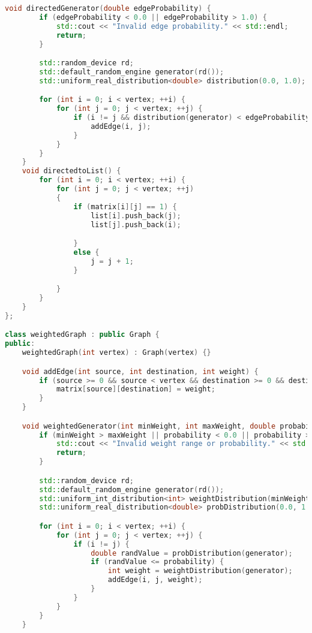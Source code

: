 \documentclass{article}
\begin{document}
\begin {small}
\begin{lstlisting}[language=C++]
    void directedGenerator(double edgeProbability) {
        if (edgeProbability < 0.0 || edgeProbability > 1.0) {
            std::cout << "Invalid edge probability." << std::endl;
            return;
        }

        std::random_device rd;
        std::default_random_engine generator(rd());
        std::uniform_real_distribution<double> distribution(0.0, 1.0);

        for (int i = 0; i < vertex; ++i) {
            for (int j = 0; j < vertex; ++j) {
                if (i != j && distribution(generator) < edgeProbability) {
                    addEdge(i, j);
                }
            }
        }
    }
    void directedtoList() {
        for (int i = 0; i < vertex; ++i) {
            for (int j = 0; j < vertex; ++j)
            {
                if (matrix[i][j] == 1) {
                    list[i].push_back(j);
                    list[j].push_back(i);

                }
                else {
                    j = j + 1;
                }

            }
        }
    }
};

class weightedGraph : public Graph {
public:
    weightedGraph(int vertex) : Graph(vertex) {}

    void addEdge(int source, int destination, int weight) {
        if (source >= 0 && source < vertex && destination >= 0 && destination < vertex) {
            matrix[source][destination] = weight;
        }
    }

    void weightedGenerator(int minWeight, int maxWeight, double probability) {
        if (minWeight > maxWeight || probability < 0.0 || probability > 1.0) {
            std::cout << "Invalid weight range or probability." << std::endl;
            return;
        }

        std::random_device rd;
        std::default_random_engine generator(rd());
        std::uniform_int_distribution<int> weightDistribution(minWeight, maxWeight);
        std::uniform_real_distribution<double> probDistribution(0.0, 1.0);

        for (int i = 0; i < vertex; ++i) {
            for (int j = 0; j < vertex; ++j) {
                if (i != j) {
                    double randValue = probDistribution(generator);
                    if (randValue <= probability) {
                        int weight = weightDistribution(generator);
                        addEdge(i, j, weight);
                    }
                }
            }
        }
    }


\end{lstlisting}
\end{small}
\end{document}
